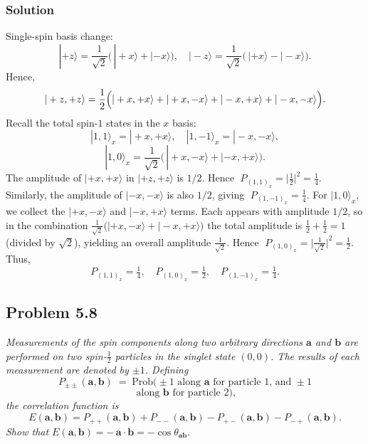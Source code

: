 \documentclass[twocolumn]{article}
\begin{document}
\begin{spacing}{1}
\subsubsection*{Solution}
Single-spin basis change:
\[
|+z\rangle 
= \frac{1}{\sqrt{2}}\bigl(\,|+x\rangle + |-x\rangle\bigr),
\quad
|-z\rangle
= \frac{1}{\sqrt{2}}\bigl(\,|+x\rangle - |-x\rangle\bigr).
\]
Hence,
\[
|+z,+z\rangle 
= \frac{1}{2}
\Bigl(
|+x,+x\rangle 
+ |+x,-x\rangle 
+ |-x,+x\rangle 
+ |-x,-x\rangle
\Bigr).
\]
Recall the total spin-$1$ states in the $x$ basis:
\[
|1,1\rangle_x = |+x,+x\rangle,\quad
|1,-1\rangle_x = |-x,-x\rangle,
\]
\[
|1,0\rangle_x = \frac{1}{\sqrt{2}}\bigl(\,|+x,-x\rangle + |-x,+x\rangle\bigr).
\]
The amplitude of \(|+x,+x\rangle\) in \(|+z,+z\rangle\) is \(1/2\). Hence 
\(\;P_{(1,1)_x} = \bigl|\tfrac{1}{2}\bigr|^2 = \tfrac{1}{4}\).
Similarly, the amplitude of \(|-x,-x\rangle\) is also \(1/2\), giving 
\(\;P_{(1,-1)_x} = \tfrac{1}{4}\).
For \(|1,0\rangle_x\), we collect the \(|+x,-x\rangle\) and \(|-x,+x\rangle\) terms. Each appears with amplitude \(1/2\), so in the combination 
\(\tfrac{1}{\sqrt{2}}\bigl(|+x,-x\rangle + |-x,+x\rangle\bigr)\) 
the total amplitude is 
\(\tfrac{1}{2}+\tfrac{1}{2} = 1\) (divided by \(\sqrt{2}\)), 
yielding an overall amplitude \(\tfrac{1}{\sqrt{2}}\). 
Hence 
\(\;P_{(1,0)_x} = \bigl|\tfrac{1}{\sqrt{2}}\bigr|^2 = \tfrac{1}{2}\).
Thus,
\[
P_{(1,1)_x} = \tfrac{1}{4},\quad
P_{(1,0)_x} = \tfrac{1}{2},\quad
P_{(1,-1)_x} = \tfrac{1}{4}.
\]

\subsection{Problem 5.8}
\textit{Measurements of the spin components along two arbitrary directions $\mathbf{a}$ and $\mathbf{b}$ are performed on two spin-$\tfrac12$ particles in the singlet state \((0,0)\). The results of each measurement are denoted by $\pm1$. Defining
\[
P_{\pm\pm}(\mathbf{a},\mathbf{b}) \;=\; 
\text{Prob}\bigl(\pm1 \text{ along } \mathbf{a} \text{ for particle 1, and } \pm1 
\]
\[
\text{ along } \mathbf{b} \text{ for particle 2}\bigr),
\]
the correlation function is 
\[
E(\mathbf{a},\mathbf{b}) 
= P_{++}(\mathbf{a},\mathbf{b})
+ P_{--}(\mathbf{a},\mathbf{b})
- P_{+-}(\mathbf{a},\mathbf{b})
- P_{-+}(\mathbf{a},\mathbf{b}).
\]
Show that 
\(
E(\mathbf{a},\mathbf{b}) 
= -\,\mathbf{a}\cdot\mathbf{b}
= -\cos\theta_{\mathbf{ab}}.
\)}


\end{spacing}
\end{document}
